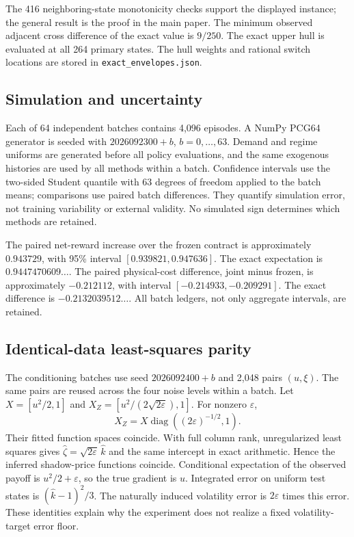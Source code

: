 The 416 neighboring-state monotonicity checks support the displayed instance; the general result is the proof in the main paper. The minimum observed adjacent cross difference of the exact value is $9/250$. The exact upper hull is evaluated at all 264 primary states. The hull weights and rational switch locations are stored in \texttt{exact\_envelopes.json}.

\subsection{Simulation and uncertainty}
Each of 64 independent batches contains 4,096 episodes. A NumPy PCG64 generator is seeded with $2026092300+b$, $b=0,\ldots,63$. Demand and regime uniforms are generated before all policy evaluations, and the same exogenous histories are used by all methods within a batch. Confidence intervals use the two-sided Student quantile with 63 degrees of freedom applied to the batch means; comparisons use paired batch differences. They quantify simulation error, not training variability or external validity. No simulated sign determines which methods are retained.

The paired net-reward increase over the frozen contract is approximately $0.943729$, with 95\% interval $[0.939821,0.947636]$. The exact expectation is $0.9447470609\ldots$. The paired physical-cost difference, joint minus frozen, is approximately $-0.212112$, with interval $[-0.214933,-0.209291]$. The exact difference is $-0.2132039512\ldots$. All batch ledgers, not only aggregate intervals, are retained.

\subsection{Identical-data least-squares parity}
The conditioning batches use seed $2026092400+b$ and 2,048 pairs $(u,\xi)$. The same pairs are reused across the four noise levels within a batch. Let $X=[u^2/2,1]$ and $X_Z=[u^2/(2\sqrt{2\varepsilon}),1]$. For nonzero $\varepsilon$,
\[
 X_Z=X\operatorname{diag}((2\varepsilon)^{-1/2},1).
\]
Their fitted function spaces coincide. With full column rank, unregularized least squares gives $\widehat\zeta=\sqrt{2\varepsilon}\,\widehat k$ and the same intercept in exact arithmetic. Hence the inferred shadow-price functions coincide. Conditional expectation of the observed payoff is $u^2/2+\varepsilon$, so the true gradient is $u$. Integrated error on uniform test states is $(\widehat k-1)^2/3$. The naturally induced volatility error is $2\varepsilon$ times this error. These identities explain why the experiment does not realize a fixed volatility-target error floor.

